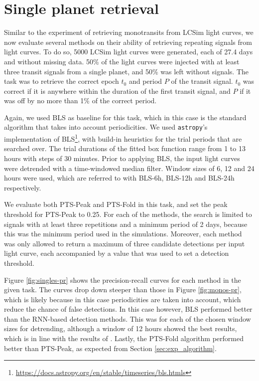 
\section{Single planet retrieval}
\label{sec:exp_singles}

Similar to the experiment of retrieving monotransits from LCSim light curves, we now evaluate several methods on their ability of retrieving repeating signals from light curves. To do so, 5000 LCSim light curves were generated, each of 27.4 days and without missing data. 50\% of the light curves were injected with at least three transit signals from a single planet, and 50\% was left without signals. The task was to retrieve the correct epoch $t_0$ and period $P$ of the transit signal. $t_0$ was correct if it is anywhere within the duration of the first transit signal, and $P$ if it was off by no more than 1\% of the correct period.

Again, we used BLS as baseline for this task, which in this case is the standard algorithm that takes into account periodicities. We used \texttt{astropy}'s implementation of BLS\footnote{\url{https://docs.astropy.org/en/stable/timeseries/bls.htmls}}, with build-in heuristics for the trial periods that are searched over. The trial durations of the fitted box function range from 1 to 13 hours with steps of 30 minutes. Prior to applying BLS, the input light curves were detrended with a time-windowed median filter. Window sizes of 6, 12 and 24 hours were used, which are referred to with BLS-6h, BLS-12h and BLS-24h respectively.

We evaluate both PTS-Peak and PTS-Fold in this task, and set the peak threshold for PTS-Peak to 0.25. For each of the methods, the search is limited to signals with at least three repetitions and a minimum period of 2 days, because this was the minimum period used in the simulations. Moreover, each method was only allowed to return a maximum of three candidate detections per input light curve, each accompanied by a value that was used to set a detection threshold. 

Figure \ref{fig:singles-pr} shows the precision-recall curves for each method in the given task. The curves drop down steeper than those in Figure \ref{fig:monos-pr}, which is likely because in this case periodicities are taken into account, which reduce the chance of false detections. In this case however, BLS performed better than the RNN-based detection methods. This was for each of the chosen window sizes for detrending, although a window of 12 hours showed the best results, which is in line with the results of \cite{hippke2019wotan}. Lastly, the PTS-Fold algorithm performed better than PTS-Peak, as expected from Section \ref{sec:exp_algorithm}.



